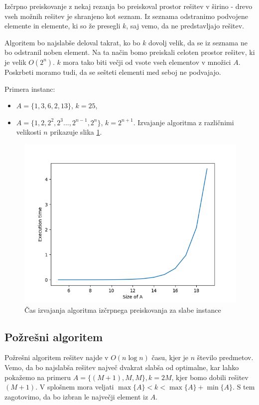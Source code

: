 \documentclass{article}
\begin{document}
Izčrpno preiskovanje z nekaj rezanja bo preiskoval prostor rešitev v širino -
drevo vseh možnih rešitev je shranjeno kot seznam. Iz seznama odstranimo
podvojene elemente in elemente, ki so že presegli $k$, saj vemo, da ne
predstavljajo rešitev.

Algoritem bo najslabše deloval takrat, ko bo $k$ dovolj velik, da se iz seznama
ne bo odstranil noben element. Na ta način bomo preiskali celoten prostor
rešitev, ki je velik $O(2^n)$. $k$ mora tako biti večji od vsote vseh elementov
v množici $A$. Poskrbeti moramo tudi, da se sešteti elementi med seboj ne
podvajajo.

Primera instanc:
\begin{itemize}
	\item $A = \{ 1, 3, 6, 2, 13 \}$, $k = 25$,
	\item $A = \{ 1, 2, 2^2, 2^3 ..., 2^{n-1}, 2^n \}$, $k = 2^{n+1}$. Izvajanje
	algoritma z različnimi velikosti $n$ prikazuje slika \ref{fig:exh}.
\end{itemize}

\begin{figure}
	\centering
	\includegraphics[width=0.8\linewidth]{figs/exh-hard.png}
	\caption{Čas izvajanja algoritma izčrpnega preiskovanja za slabe instance}
	\label{fig:exh}
\end{figure}

\subsection{Požrešni algoritem}

Požrešni algoritem rešitev najde v $O(n \log n)$ času, kjer je $n$ število predmetov. Vemo, da bo najslabša rešitev največ dvakrat slabša od optimalne, kar lahko pokažemo na primeru $A = \{(M + 1), M, M \}, k = 2M$, kjer bomo dobili rešitev $(M+1)$. V splošnem mora veljati $\max\{A\} < k < \max\{A\} + \min\{A\}$. S tem zagotovimo, da bo izbran le največji element iz $A$.
\end{document}
